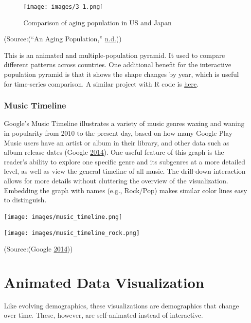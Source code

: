 \documentclass[]{book}
\begin{document}
\begin{figure}
\centering
\texttt{[image: images/3\_1.png]}
\caption{Comparison of aging population in US and Japan}
\end{figure}

(Source:(``An Aging Population,'' \protect\hyperlink{ref-animated_pyramid}{n.d.}))

This is an animated and multiple-population pyramid. It used to compare different patterns across countries. One additional benefit for the interactive population pyramid is that it shows the shape changes by year, which is useful for time-series comparison. A similar project with R code is \href{https://www.r-bloggers.com/who-is-old-visualizing-the-concept-of-prospective-ageing-with-animated-population-pyramids/}{here}.

\hypertarget{music-timeline}{%
\subsubsection{Music Timeline}\label{music-timeline}}

Google's Music Timeline illustrates a variety of music genres waxing and waning in popularity from 2010 to the present day, based on how many Google Play Music users have an artist or album in their library, and other data such as album release dates (Google \protect\hyperlink{ref-google_music}{2014}). One useful feature of this graph is the reader's ability to explore one specific genre and its subgenres at a more detailed level, as well as view the general timeline of all music. The drill-down interaction allows for more details without cluttering the overview of the visualization. Embedding the graph with names (e.g., Rock/Pop) makes similar color lines easy to distinguish.

\texttt{[image: images/music\_timeline.png]}

\texttt{[image: images/music\_timeline\_rock.png]}

(Source:(Google \protect\hyperlink{ref-google_music}{2014}))

\hypertarget{animated-data-visualization}{%
\section{Animated Data Visualization}\label{animated-data-visualization}}

Like evolving demographics, these visualizations are demographics that change over time. These, however, are self-animated instead of interactive.
\end{document}
